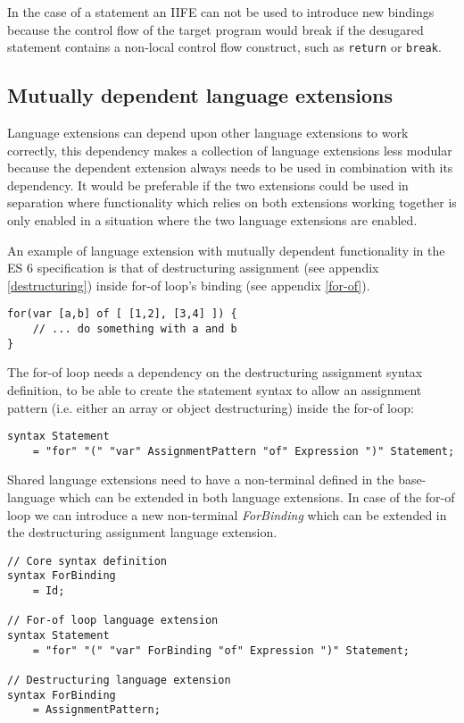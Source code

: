 In the case of a statement an IIFE can not be used to introduce new bindings because the control flow of the target program would break if the desugared statement contains a non-local control flow construct, such as \lstinline$return$ or \lstinline$break$. 

\subsection{Mutually dependent language extensions} \label{par:combined-extensions}
Language extensions can depend upon other language extensions to work correctly, this dependency makes a collection of language extensions less modular because the dependent extension always needs to be used in combination with its dependency. It would be preferable if the two extensions could be used in separation where functionality which relies on both extensions working together is only enabled in a situation where the two language extensions are enabled.

An example of language extension with mutually dependent functionality in the ES 6 specification is that of destructuring assignment (see appendix \ref{destructuring}) inside for-of loop's binding (see appendix \ref{for-of}).

\begin{lstlisting}
for(var [a,b] of [ [1,2], [3,4] ]) {
	// ... do something with a and b
}
\end{lstlisting}

The for-of loop needs a dependency on the destructuring assignment syntax definition, to be able to create the statement syntax to allow an assignment pattern (i.e. either an array or object destructuring) inside the for-of loop:

\begin{lstlisting}[language=rascal]
syntax Statement
	= "for" "(" "var" AssignmentPattern "of" Expression ")" Statement;
\end{lstlisting}

Shared language extensions need to have a non-terminal defined in the base-language which can be extended in both language extensions. In case of the for-of loop we can introduce a new non-terminal \textit{ForBinding} which can be extended in the destructuring assignment language extension.

\begin{lstlisting}[language=rascal]
// Core syntax definition
syntax ForBinding
	= Id;

// For-of loop language extension
syntax Statement
	= "for" "(" "var" ForBinding "of" Expression ")" Statement;

// Destructuring language extension
syntax ForBinding
	= AssignmentPattern;
\end{lstlisting}

